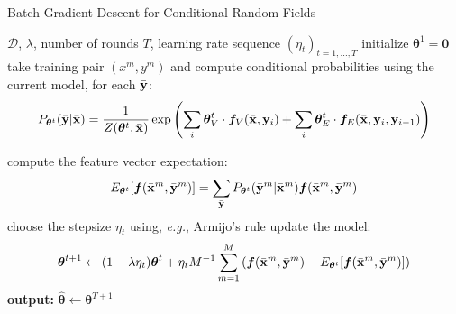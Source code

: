 \begin{algorithm}[t]
   \caption{Batch Gradient Descent for Conditional Random Fields \label{alg:crf_batch}}
\begin{algorithmic}[1]
    $\mathcal{D}$, $\lambda$, number of rounds $T$,
   learning rate sequence $(\eta_t)_{t = 1,\ldots,T}$
   \STATE initialize $\boldsymbol{\theta}^1 = \mathbf{0}$
	\STATE take training pair $(x^m, y^m)$ and compute conditional
        probabilities using the current model, for each $\bar{\mathbf{y}}$:
$$P_{\boldsymbol{\theta}^t}(\bar{\mathbf{y}}|\bar{\mathbf{x}}) = \frac{1}{Z(\boldsymbol{\theta}^t,\bar{\mathbf{x}})}\exp\left(\sum_i \boldsymbol{\theta}^t_V \cdot 
\boldsymbol{f}_V(\bar{\mathbf{x}},\mathbf{y}_i) + 
\sum_i\boldsymbol{\theta}^t_E \cdot
\boldsymbol{f}_E(\bar{\mathbf{x}},\mathbf{y}_i,\mathbf{y}_{i-1})\right)$$

	\STATE compute the feature vector expectation:  
	$$E_{\boldsymbol{\theta}^t}[\boldsymbol{f}(\bar{\mathbf{x}}^m,\bar{\mathbf{y}}^m)] = \sum_{\bar{\mathbf{y}}} P_{\boldsymbol{\theta}^t}(\bar{\mathbf{y}}^m|\bar{\mathbf{x}}^m) \boldsymbol{f}(\bar{\mathbf{x}}^m,\bar{\mathbf{y}}^m)$$
	\ENDFOR
	\STATE choose the stepsize $\eta_t$ using, \emph{e.g.}, Armijo's rule
	\STATE update the model: 
	$$\boldsymbol{\theta}^{t+1} \leftarrow (1-\lambda \eta_t) \boldsymbol{\theta}^{t} + \eta_t M^{-1} \sum_{m=1}^M \left( \boldsymbol{f}(\bar{\mathbf{x}}^m,\bar{\mathbf{y}}^m) 
	- E_{\boldsymbol{\theta}^t}[\boldsymbol{f}(\bar{\mathbf{x}}^m,\bar{\mathbf{y}}^m)]\right)$$
	\ENDFOR
   \STATE \textbf{output:} $\hat{\boldsymbol{\theta}} \leftarrow \boldsymbol{\theta}^{T+1}$
\end{algorithmic}
\end{algorithm}


